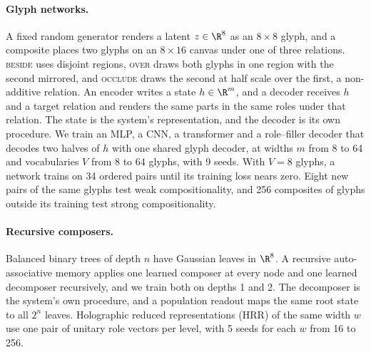 \paragraph{Glyph networks.} A fixed random generator renders a latent $z \in \R^{8}$ as an $8 \times 8$ glyph, and a composite places two glyphs on an $8 \times 16$ canvas under one of three relations. \textsc{beside} uses disjoint regions, \textsc{over} draws both glyphs in one region with the second mirrored, and \textsc{occlude} draws the second at half scale over the first, a non-additive relation. An encoder writes a state $h \in \R^m$, and a decoder receives $h$ and a target relation and renders the same parts in the same roles under that relation. The state is the system's representation, and the decoder is its own procedure. We train an MLP, a CNN, a transformer and a role--filler decoder that decodes two halves of $h$ with one shared glyph decoder, at widths $m$ from 8 to 64 and vocabularies $V$ from 8 to 64 glyphs, with 9 seeds. With $V = 8$ glyphs, a network trains on 34 ordered pairs until its training loss nears zero. Eight new pairs of the same glyphs test weak compositionality, and 256 composites of glyphs outside its training test strong compositionality.

\paragraph{Recursive composers.} Balanced binary trees of depth $n$ have Gaussian leaves in $\R^8$. A recursive auto-associative memory \citep{pollack1990} applies one learned composer at every node and one learned decomposer recursively, and we train both on depths 1 and 2. The decomposer is the system's own procedure, and a population readout maps the same root state to all $2^n$ leaves. Holographic reduced representations (HRR) of the same width $w$ use one pair of unitary role vectors per level, with 5 seeds for each $w$ from 16 to 256.

